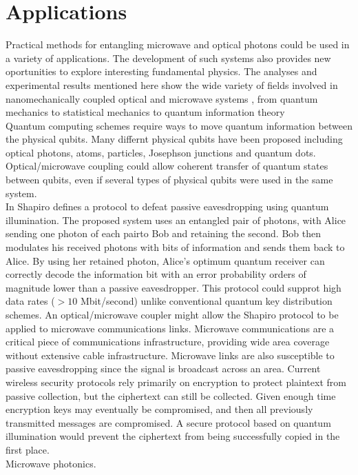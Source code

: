 \documentclass[a4paper,11pt, twocolumn]{article}
\numberwithin{equation}{section}
\begin{document}
\section{Applications}
Practical methods for entangling microwave and optical photons could be used in a variety of applications.
The development of such systems also provides new oportunities to explore interesting fundamental physics.
The analyses and experimental results mentioned here show the wide variety of fields involved in nanomechanically coupled optical and microwave systems , from quantum mechanics to statistical mechanics to quantum information theory
\\ 
Quantum computing schemes require ways to move quantum information between the physical qubits.
Many differnt physical qubits have been proposed including optical photons, atoms, particles, Josephson junctions and quantum dots.
Optical/microwave coupling could allow coherent transfer of quantum states between qubits, even if several types of physical qubits were used in the same system.
\\
In \cite{qcomm} Shapiro defines a protocol to defeat passive eavesdropping using quantum illumination.
The proposed system uses an entangled pair of photons, with Alice sending one photon of each pairto Bob and retaining the second.
Bob then modulates his received photons with bits of information and sends them back to Alice.
By using her retained photon, Alice's optimum quantum receiver can correctly decode the information bit with an error probability orders of magnitude lower than a passive eavesdropper.
This protocol could supprot high data rates ($>10$ Mbit/second) unlike conventional quantum key distribution schemes.
An optical/microwave coupler might allow the Shapiro protocol to be applied to microwave communications links. 
Microwave communications are a critical piece of communications infrastructure, providing wide area coverage without extensive cable infrastructure.
Microwave links are also susceptible to passive eavesdropping since the signal is broadcast across an area. 
Current wireless security protocols rely primarily on encryption to protect plaintext from passive collection, but the ciphertext can still be collected.
Given enough time encryption keys may eventually be compromised, and then all previously transmitted messages are compromised.
A secure protocol based on quantum illumination would prevent the ciphertext from being successfully copied in the first place.
\\
Microwave photonics.
\end{document}
